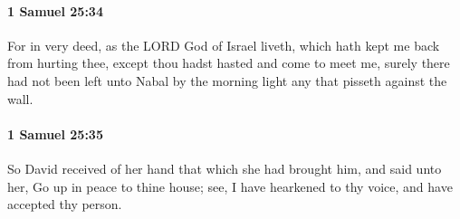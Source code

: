 		\paragraph{1 Samuel 25:34} %
			\label{1SAMUEL-25-34}

			For in very deed, as the LORD God of Israel liveth, which hath kept me back from hurting thee, except thou hadst hasted and come to meet me, surely there had not been left unto Nabal by the morning light any that pisseth against the wall.


		\paragraph{1 Samuel 25:35} %
			\label{1SAMUEL-25-35}

			So David received of her hand that which she had brought him, and said unto her, Go up in peace to thine house; see, I have hearkened to thy voice, and have accepted thy person.

